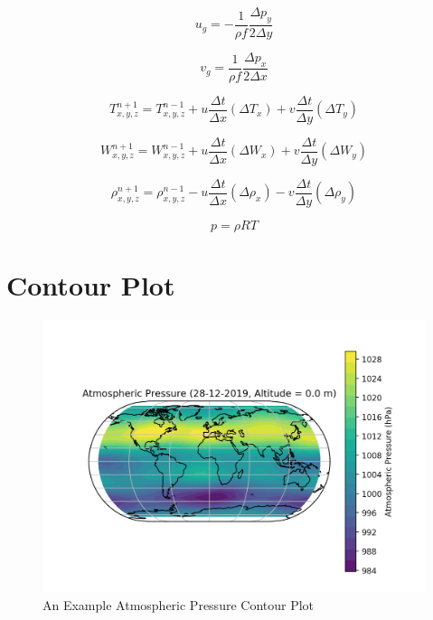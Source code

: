 \documentclass[thesis]{poster_style}
\begin{document}
\begin{poster}
\begin{equation}
    u_g = -\frac{1}{\rho f} \frac{\Delta p_y}{2 \Delta y}
    \label{u}
\end{equation}

\begin{equation}
    v_g = \frac{1}{\rho f} \frac{\Delta p_x}{2 \Delta x}
    \label{v}
\end{equation}

\begin{equation}
    T^{n + 1}_{x, y, z} = T^{n - 1}_{x, y, z} + u \frac{\Delta t}{\Delta x} (\Delta T_{x})
    + v \frac{\Delta t}{\Delta y} (\Delta T_{y})
    \label{temp}
\end{equation}

\begin{equation}
    W^{n + 1}_{x, y, z} = W^{n - 1}_{x, y, z} + u \frac{\Delta t}{\Delta x} (\Delta W_{x})
    + v \frac{\Delta t}{\Delta y} (\Delta W_{y})
    \label{pwv}
\end{equation}

\begin{equation}
    \rho^{n + 1}_{x, y, z} = \rho^{n - 1}_{x, y, z} - u \frac{\Delta t}{\Delta x} (\Delta \rho_{x})
    - v \frac{\Delta t}{\Delta y} (\Delta \rho_{y})
    \label{mass_continuity}
\end{equation}

\begin{equation}
    p = \rho R T
    \label{state_eq}
\end{equation}

\section{Contour Plot}

\begin{center}
    \begin{figure}
        \includegraphics[width=.65\linewidth]{pressure.png}
        \caption{An Example Atmospheric Pressure Contour Plot}
    \end{figure}
\end{center}


\end{poster}
\end{document}
